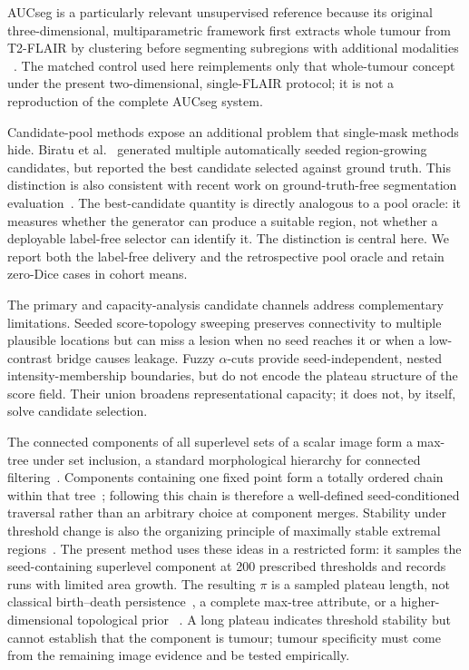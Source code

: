 \documentclass[11pt,a4paper]{article}
\begin{document}
AUCseg is a particularly relevant unsupervised reference because its original
three-dimensional, multiparametric framework first extracts whole tumour from
T2-FLAIR by clustering before segmenting subregions with additional modalities
~\cite{zhao2021aucseg}. The matched control used here reimplements only that
whole-tumour concept under the present two-dimensional, single-FLAIR protocol;
it is not a reproduction of the complete AUCseg system.

Candidate-pool methods expose an additional problem that single-mask methods
hide. Biratu et al.~\cite{biratu2021} generated multiple automatically seeded
region-growing candidates, but reported the best candidate selected against
ground truth. This distinction is also consistent with recent work on
ground-truth-free segmentation evaluation~\cite{senbi2024}. The best-candidate
quantity is directly analogous to a pool oracle: it measures
whether the generator can produce a suitable region, not whether a deployable
label-free selector can identify it. The distinction is central here. We report
both the label-free delivery and the retrospective pool oracle and retain
zero-Dice cases in cohort means.

The primary and capacity-analysis candidate channels address complementary limitations.
Seeded score-topology sweeping preserves connectivity to multiple plausible
locations but can miss a lesion when no seed reaches it or when a low-contrast
bridge causes leakage. Fuzzy $\alpha$-cuts provide seed-independent, nested
intensity-membership boundaries, but do not encode the plateau structure of the
score field. Their union broadens representational capacity; it does not, by
itself, solve candidate selection.

The connected components of all superlevel sets of a scalar image form a
max-tree under set inclusion, a standard morphological hierarchy for connected
filtering~\cite{salembier2009,passat2023}. Components containing one fixed point
form a totally ordered chain within that tree~\cite{passat2011}; following this
chain is therefore a well-defined seed-conditioned traversal rather than an
arbitrary choice at component merges. Stability under threshold change is also
the organizing principle of maximally stable extremal regions~\cite{matas2004}.
The present method uses these ideas in a restricted form: it samples the
seed-containing superlevel component at 200 prescribed thresholds and records
runs with limited area growth. The resulting $\pi$ is a sampled plateau length,
not classical birth--death persistence~\cite{edelsbrunner2002}, a complete
max-tree attribute, or a higher-dimensional topological prior
~\cite{francois2026}. A long plateau indicates threshold stability but cannot
establish that the component is tumour; tumour specificity must come from the
remaining image evidence and be tested empirically.
\end{document}
